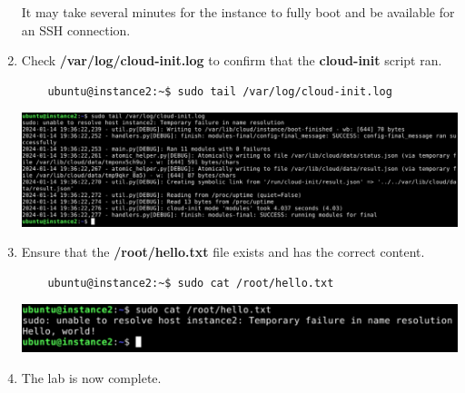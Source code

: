 \documentclass[letterpaper, 12pt]{article}
\begin{document}
\begin{enumerate}
    \begin{notebox}
        It may take several minutes for the instance to fully boot and be available for an SSH connection.
    \end{notebox}

    \item Check \textbf{/var/log/cloud-init.log} to confirm that the \textbf{cloud-init} script ran.
    \begin{lstlisting}
    ubuntu@instance2:~$ sudo tail /var/log/cloud-init.log
    \end{lstlisting}

    \begin{center}
        \includegraphics[width=\linewidth]{images/part2/step6.png}
    \end{center}

    \item Ensure that the \textbf{/root/hello.txt} file exists and has the correct content.
    \begin{lstlisting}
    ubuntu@instance2:~$ sudo cat /root/hello.txt
    \end{lstlisting}

    \begin{center}
        \includegraphics[width=\linewidth]{images/part2/step7.png}
    \end{center}

    \item The lab is now complete.

\end{enumerate}
\end{document}
